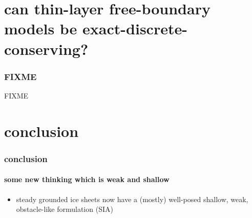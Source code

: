 \documentclass[hide notes,intlimits]{beamer}
\begin{document}
\section[conservation w free boundaries?]{can thin-layer free-boundary models be exact-discrete-conserving?}

\begin{frame}
  \frametitle{FIXME} 

FIXME
\end{frame}


\section*{conclusion}

\begin{frame}
  \frametitle{conclusion}
  \framesubtitle{some new thinking which is weak and shallow}

\begin{itemize}
\item steady grounded ice sheets now have a (mostly) well-posed shallow, weak, obstacle-like formulation (SIA)
\end{itemize}
\end{frame}
\end{document}
